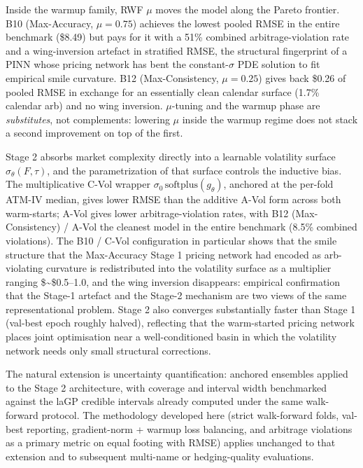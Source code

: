 \documentclass[
  11pt,
]{article}
\begin{document}
Inside the warmup family, RWF \(\mu\) moves the model along the Pareto
frontier. B10 (Max-Accuracy, \(\mu = 0.75\)) achieves the lowest pooled
RMSE in the entire benchmark (\$8.49) but pays for it with a 51\%
combined arbitrage-violation rate and a wing-inversion artefact in
stratified RMSE, the structural fingerprint of a PINN whose pricing
network has bent the constant-\(\sigma\) PDE solution to fit empirical
smile curvature. B12 (Max-Consistency, \(\mu = 0.25\)) gives back \$0.26
of pooled RMSE in exchange for an essentially clean calendar surface
(1.7\% calendar arb) and no wing inversion. \(\mu\)-tuning and the
warmup phase are \emph{substitutes}, not complements: lowering \(\mu\)
inside the warmup regime does not stack a second improvement on top of
the first.

Stage 2 absorbs market complexity directly into a learnable volatility
surface \(\sigma_\theta(F,\tau)\), and the parametrization of that
surface controls the inductive bias. The multiplicative C-Vol wrapper
\(\sigma_0\,\mathrm{softplus}(g_\theta)\), anchored at the per-fold
ATM-IV median, gives lower RMSE than the additive A-Vol form across both
warm-starts; A-Vol gives lower arbitrage-violation rates, with B12
(Max-Consistency) / A-Vol the cleanest model in the entire benchmark
(8.5\% combined violations). The B10 / C-Vol configuration in particular
shows that the smile structure that the Max-Accuracy Stage 1 pricing
network had encoded as arb-violating curvature is redistributed into the
volatility surface as a multiplier ranging \$\sim\$0.5--1.0, and the
wing inversion disappears: empirical confirmation that the Stage-1
artefact and the Stage-2 mechanism are two views of the same
representational problem. Stage 2 also converges substantially faster
than Stage 1 (val-best epoch roughly halved), reflecting that the
warm-started pricing network places joint optimisation near a
well-conditioned basin in which the volatility network needs only small
structural corrections.

The natural extension is uncertainty quantification: anchored ensembles
applied to the Stage 2 architecture, with coverage and interval width
benchmarked against the laGP credible intervals already computed under
the same walk-forward protocol. The methodology developed here (strict
walk-forward folds, val-best reporting, gradient-norm + warmup loss
balancing, and arbitrage violations as a primary metric on equal footing
with RMSE) applies unchanged to that extension and to subsequent
multi-name or hedging-quality evaluations.
\end{document}
